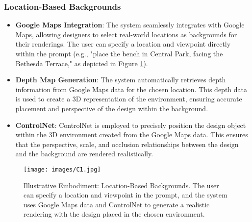 \subsubsection{Location-Based Backgrounds}
\begin{itemize}
\item \textbf{Google Maps Integration}: The system seamlessly integrates with Google Maps, allowing designers to select real-world locations as backgrounds for their renderings. The user can specify a location and viewpoint directly within the prompt (e.g., "place the bench in Central Park, facing the Bethesda Terrace," as depicted in Figure \ref{fig:location-based-background}).
\item \textbf{Depth Map Generation}: The system automatically retrieves depth information from Google Maps data for the chosen location. This depth data is used to create a 3D representation of the environment, ensuring accurate placement and perspective of the design within the background.
\item \textbf{ControlNet}: ControlNet is employed to precisely position the design object within the 3D environment created from the Google Maps data. This ensures that the perspective, scale, and occlusion relationships between the design and the background are rendered realistically.
\end{itemize}

\begin{figure}
\centering
\texttt{[image: images/C1.jpg]}
\caption{Illustrative Embodiment: Location-Based Backgrounds. The user can specify a location and viewpoint in the prompt, and the system uses Google Maps data and ControlNet to generate a realistic rendering with the design placed in the chosen environment.}
\label{fig:location-based-background}
\end{figure}


